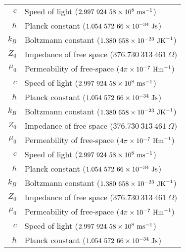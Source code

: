 \begin{longtable}{rl}
$c$ & Speed of light ($2.997\ 924\ 58 \times 10^{8}\ \mbox{ms}^{-1}$) \\
$\hbar$ & Planck constant ($1.054\ 572\ 66\times 10^{-34}\ \mbox{Js}$) \\
$k_B$ & Boltzmann constant  ($1.380\ 658\times 10^{-23}\ \mbox{JK}^{-1} $) \\
$Z_0$ &Impedance of free space  ($376.730\ 313\ 461\ \Omega) $ \\
$\mu_0$ &Permeability of free-space ($4\pi\times 10^{-7}\ \mbox{Hm}^{-1}$) \\
$c$ & Speed of light ($2.997\ 924\ 58 \times 10^{8}\ \mbox{ms}^{-1}$) \\
$\hbar$ & Planck constant ($1.054\ 572\ 66\times 10^{-34}\ \mbox{Js}$) \\
$k_B$ & Boltzmann constant  ($1.380\ 658\times 10^{-23}\ \mbox{JK}^{-1} $) \\
$Z_0$ &Impedance of free space  ($376.730\ 313\ 461\ \Omega) $ \\
$\mu_0$ &Permeability of free-space ($4\pi\times 10^{-7}\ \mbox{Hm}^{-1}$) \\
$c$ & Speed of light ($2.997\ 924\ 58 \times 10^{8}\ \mbox{ms}^{-1}$) \\
$\hbar$ & Planck constant ($1.054\ 572\ 66\times 10^{-34}\ \mbox{Js}$) \\
$k_B$ & Boltzmann constant  ($1.380\ 658\times 10^{-23}\ \mbox{JK}^{-1} $) \\
$Z_0$ &Impedance of free space  ($376.730\ 313\ 461\ \Omega) $ \\
$\mu_0$ &Permeability of free-space ($4\pi\times 10^{-7}\ \mbox{Hm}^{-1}$) \\
$c$ & Speed of light ($2.997\ 924\ 58 \times 10^{8}\ \mbox{ms}^{-1}$) \\
$\hbar$ & Planck constant ($1.054\ 572\ 66\times 10^{-34}\ \mbox{Js}$) 
\end{longtable}

